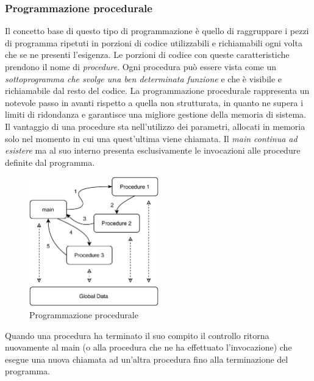 \subsubsection{Programmazione procedurale}
Il concetto base di questo tipo di programmazione è quello di raggruppare i pezzi di programma ripetuti in porzioni di codice utilizzabili e richiamabili ogni volta che se ne presenti l’esigenza. Le porzioni di codice con queste caratteristiche prendono il nome di \textit{procedure}. Ogni procedura può essere vista come un \textit{sottoprogramma che svolge una ben determinata funzione} e che è visibile e richiamabile dal resto del codice. La programmazione procedurale rappresenta un notevole passo in avanti rispetto a quella non strutturata, in quanto ne supera i limiti di ridondanza e garantisce una migliore gestione della memoria di sistema. Il vantaggio di una procedure sta nell'utilizzo dei parametri, allocati in memoria solo nel momento in cui una quest'ultima viene chiamata. Il \textit{main continua ad esistere} ma al suo interno presenta esclusivamente le invocazioni alle procedure definite dal programma. 
\begin{figure}[H]
    \centering
    \includegraphics[width=0.50\textwidth]{images/01_2_procedural_programming.pdf}
    \caption{Programmazione procedurale}
    \label{fig:procedural-programming}
\end{figure}
Quando una procedura ha terminato il suo compito il controllo ritorna nuovamente al main (o alla procedura che ne ha effettuato l’invocazione) che esegue una nuova chiamata ad un’altra procedura fino alla terminazione del programma.

